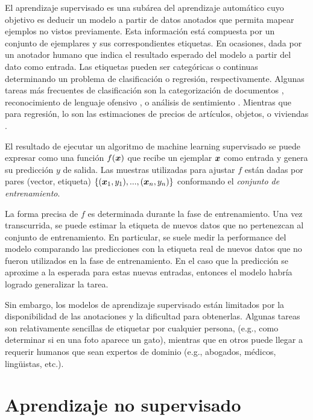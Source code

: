 El aprendizaje supervisado es una subárea del aprendizaje automático cuyo
objetivo es deducir un modelo a partir de datos anotados que permita mapear
ejemplos no vistos previamente. Esta información está compuesta por un conjunto
de ejemplares y sus correspondientes etiquetas. En ocasiones, dada por un
anotador humano que indica el resultado esperado del modelo a partir del dato
como entrada. Las etiquetas pueden ser categóricas o continuas determinando un
problema de clasificación o regresión, respectivamente. Algunas tareas más
frecuentes de clasificación son la categorización de documentos
\citep{lulu-2019}, reconocimiento de lenguaje ofensivo \citep{bencheng-2021}, o
análisis de sentimiento \citep{Nhan-2020}. Mientras que para regresión, lo son
las estimaciones de precios de artículos, objetos, o viviendas \citep{Yeh-2011}.

El resultado de ejecutar un algoritmo de machine learning supervisado se puede
expresar como una función $f(\boldsymbol{x})$ que recibe un ejemplar $\boldsymbol{x}$ como
entrada y genera su predicción $y$ de salida. Las muestras utilizadas para
ajustar $f$ están dadas por pares (vector, etiqueta) $\{(\boldsymbol{x}_1, y_1), ...,
(\boldsymbol{x}_n, y_n)\}$ conformando el \emph{conjunto de entrenamiento}.

La forma precisa de $f$ es determinada durante la fase de entrenamiento. Una vez
transcurrida, se puede estimar la etiqueta de nuevos datos que no pertenezcan al
conjunto de entrenamiento. En particular, se suele medir la performance del
modelo comparando las predicciones con la etiqueta real de nuevos datos que no
fueron utilizados en la fase de entrenamiento. En el caso que la
predicción se aproxime a la esperada para estas nuevas entradas, entonces el
modelo habría logrado generalizar la tarea.

Sin embargo, los modelos de aprendizaje supervisado están limitados por la
disponibilidad de las anotaciones y la dificultad para obtenerlas. Algunas
tareas son relativamente sencillas de etiquetar por cualquier persona, (e.g.,
como determinar si en una foto aparece un gato), mientras que en otros puede
llegar a requerir humanos que sean expertos de dominio (e.g., abogados, médicos,
lingüistas, etc.).

\section{Aprendizaje no supervisado}

